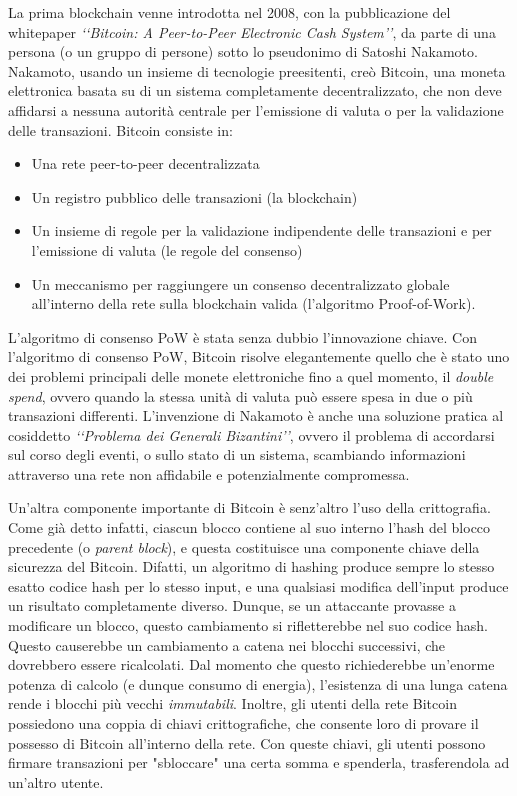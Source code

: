 La prima blockchain venne introdotta nel 2008, con la pubblicazione del whitepaper \textit{‘‘Bitcoin: A Peer-to-Peer Electronic Cash System’’}, da parte di una persona (o un gruppo di persone) sotto lo pseudonimo di Satoshi Nakamoto. Nakamoto, usando un insieme di tecnologie preesitenti, creò Bitcoin, una moneta elettronica basata su di un sistema completamente decentralizzato, che non deve affidarsi a nessuna autorità centrale per l'emissione di valuta o per la validazione delle transazioni. Bitcoin consiste in:
\begin{itemize}
    \item Una rete peer-to-peer decentralizzata
    \item Un registro pubblico delle transazioni (la blockchain)
    \item Un insieme di regole per la validazione indipendente delle transazioni e per l'emissione di valuta (le regole del consenso)
    \item Un meccanismo per raggiungere un consenso decentralizzato globale all'interno della rete sulla blockchain valida (l'algoritmo Proof-of-Work).
\end{itemize}L'algoritmo di consenso PoW è stata senza dubbio l'innovazione chiave. Con l'algoritmo di consenso PoW, Bitcoin risolve elegantemente quello che è stato uno dei problemi principali delle monete elettroniche fino a quel momento, il \textit{double spend}, ovvero quando la stessa unità di valuta può essere spesa in due o più transazioni differenti. L'invenzione di Nakamoto è anche una soluzione pratica al cosiddetto \textit{‘‘Problema dei Generali Bizantini’’}, ovvero il problema di accordarsi sul corso degli eventi, o sullo stato di un sistema, scambiando informazioni attraverso una rete non affidabile e potenzialmente compromessa. 

Un'altra componente importante di Bitcoin è senz'altro l'uso della crittografia. Come già detto infatti, ciascun blocco contiene al suo interno l'hash del blocco precedente (o \textit{parent block}), e questa costituisce una componente chiave della sicurezza del Bitcoin. Difatti, un algoritmo di hashing produce sempre lo stesso esatto codice hash per lo stesso input, e una qualsiasi modifica dell'input produce un risultato completamente diverso. Dunque, se un attaccante provasse a modificare un blocco, questo cambiamento si rifletterebbe nel suo codice hash. Questo causerebbe un cambiamento a catena nei blocchi successivi, che dovrebbero essere ricalcolati. Dal momento che questo richiederebbe un'enorme potenza di calcolo (e dunque consumo di energia), l'esistenza di una lunga catena rende i blocchi più vecchi \textit{immutabili}. Inoltre, gli utenti della rete Bitcoin possiedono una coppia di chiavi crittografiche, che consente loro di provare il possesso di Bitcoin all'interno della rete. Con queste chiavi, gli utenti possono firmare transazioni per "sbloccare" una certa somma e spenderla, trasferendola ad un'altro utente.

